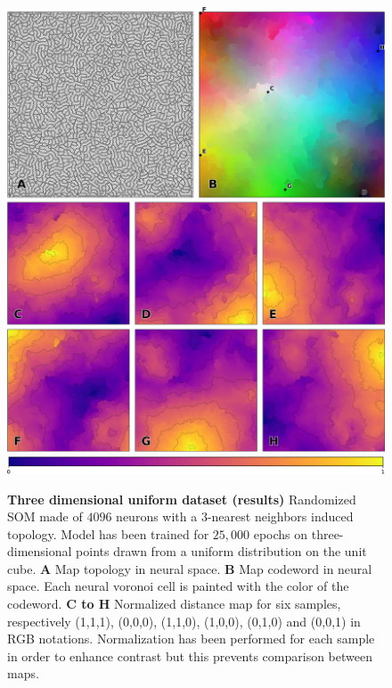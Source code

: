 \begin{figure}
  \includegraphics[width=\columnwidth]{experiment-3D-uniform.pdf}
  \vspace{2mm}
  \centering
  \includegraphics[width=.975\columnwidth]{figures/colormap.pdf}
  \caption{%
  {\bfseries \sffamily Three dimensional uniform dataset (results)}
  Randomized SOM made of $4096$ neurons with a $3$-nearest neighbors induced topology. Model has been trained for $25,000$ epochs on three-dimensional points drawn from a uniform distribution on the unit cube. \textbf{A} Map topology in neural space. \textbf{B} Map codeword in neural space. Each neural voronoi cell is painted with the color of the codeword. \textbf{C to H} Normalized distance map for six samples, respectively (1,1,1), (0,0,0), (1,1,0), (1,0,0), (0,1,0) and (0,0,1) in RGB notations. Normalization has been performed for each sample in order to enhance contrast but this prevents comparison between maps.
  }
  \label{fig:3D-uniform:results}
\end{figure}

